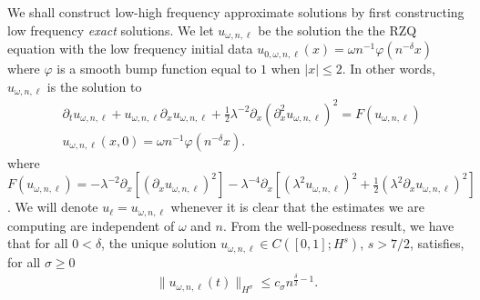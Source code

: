 \documentclass[reqno]{amsart}
\theoremstyle{plain}
\numberwithin{equation}{section}
\begin{document}
We shall construct low-high frequency approximate solutions by first constructing low frequency {\em exact} solutions. We let $u_{\omega, n,  \ell}$ be the solution the the RZQ equation with the low frequency initial data $u_{0, \omega, n, \ell}  (x) = \omega n^{-1}    \varphi  (n^{-\delta }x) $ where $\varphi $ is a smooth bump function equal to $1$ when $|x|\le 2$. In other words, $u_{\omega, n,  \ell}$ is the solution to 
\begin{align}
& \partial_t u_{\omega, n,  \ell} + u_{\omega, n,  \ell} \partial_x u_{\omega, n,  \ell}  + \frac12 \lambda^{-2} \partial_x ( \partial_x ^2 u_{\omega, n,  \ell})^2 
  =   F(u_{\omega, n,  \ell}) 
   \\
    & u_{  \omega, n, \ell}  (x, 0)  = \omega n^{-1}   \varphi (n^{-\delta }x) .
\end{align}
where $\displaystyle F(u_{\omega, n,  \ell})= - \lambda^{-2}  \partial_x \left [(\partial_x u_{\omega, n,  \ell})^2   \right ]  
  - \lambda^{-4} \partial_x \left [  ( \lambda^2    u_{\omega, n,  \ell})^2 +\frac12 (\lambda^2  \partial_ x u_{\omega, n,  \ell})^2 
   \right ]  $. We will denote $u_\ell = u_{\omega, n,  \ell}$ whenever it is clear that the estimates we are computing are independent of $\omega$ and $n$. 
  From the well-posedness result, we have that for all $0<\delta$, the unique solution $u_{\omega, n,  \ell} \in C([0, 1]; H^s) $, $s>7/2$, satisfies, for all $\sigma\ge 0$ 
\begin{align}\label{l-est}
  \| u_{\omega, n,  \ell}(t) \|_{H^\sigma} \le c_\sigma n^{\frac{\delta}{2} - 1} . 
\end{align}
   
\end{document}
